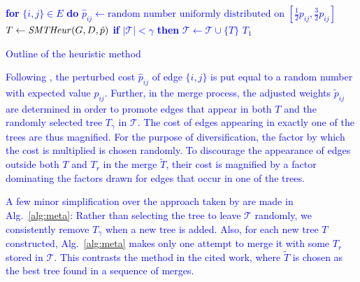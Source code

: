 \begin{algorithm}
\textcolor{blue}{
 {
  \textbf{for} $\{i,j\}\in E$ \textbf{do} $\hat{p}_{ij}\leftarrow\text{random number uniformly distributed on
  $\left[\frac{1}{2}p_{ij},\frac{3}{2}p_{ij}\right]$}$\;
  $T\leftarrow\text{\textit{SMTHeur}$(G,D,\hat{p})$}$\;
  \textbf{if} $|\mathcal{T}|<\gamma$ \textbf{then} $\mathcal{T}\leftarrow \mathcal{T}\cup \{T\}$\;
}
\Return $T_1$
}

\textcolor{blue}{
\caption{Outline of the heuristic method}
\label{alg:meta}
}
\end{algorithm}

\textcolor{blue}{
Following \citet{pajor18}, the perturbed cost $\hat{p}_{ij}$ of edge $\{i,j\}$ is put equal to a random number with expected value $p_{ij}$.
Further, in the merge process, the adjusted weights $\tilde{p}_{ij}$ are determined in order to 
promote edges that appear in both $T$ and the randomly selected tree $T_{\gamma}$ in $\mathcal{T}$. 
The cost of edges appearing in exactly one of the trees are thus magnified.
For the purpose of diversification, the factor by which the cost is multiplied is chosen randomly.
To discourage the appearance of edges outside both $T$ and $T_r$ in the merge $\tilde{T}$,
their cost is magnified by a factor dominating the factors drawn for edges that occur in one of the trees.
}

\textcolor{blue}{
A few minor simplification over the approach taken by \citet{pajor18} are made in Alg.\ \ref{alg:meta}:
Rather than selecting the tree to leave $\mathcal{T}$ randomly, we consistently remove $T_{\gamma}$ when a new tree is added.
Also, for each new tree $T$ constructed, Alg.\ \ref{alg:meta} makes only one attempt to merge it with some $T_r$ stored in $\mathcal{T}$.
This contrasts the method in the cited work, where $\tilde{T}$ is chosen as the best tree found in a sequence of merges.
} \\

